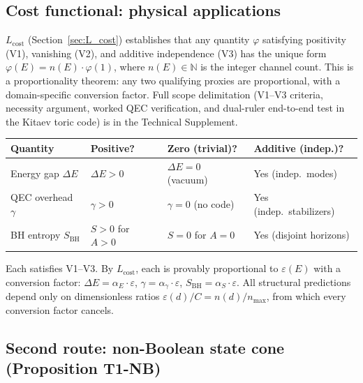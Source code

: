 \documentclass[11pt]{article}
\theoremstyle{remark}
\begin{document}
\subsection{Cost functional: physical applications}
\label{sec:cost_consequences}

\noindent $L_{\mathrm{cost}}$ (Section~\ref{sec:L_cost}) establishes that any quantity $\varphi$ satisfying positivity (V1), vanishing (V2), and additive independence (V3) has the unique form $\varphi(E) = n(E) \cdot \varphi(1)$, where $n(E) \in \mathbb{N}$ is the integer channel count.  This is a proportionality theorem: any two qualifying proxies are proportional, with a domain-specific conversion factor.  Full scope delimitation (V1--V3 criteria, necessity argument, worked QEC verification, and dual-ruler end-to-end test in the Kitaev toric code) is in the Technical Supplement.\label{sec:Lcost_worked}\label{sec:dual_ruler}\label{box:Lcost_proportionality}

\smallskip
\begin{center}
\smallskip
{\small
\begin{tabular*}{\textwidth}{@{\extracolsep{\fill}}llll@{}}
\textbf{Quantity} & \textbf{Positive?} & \textbf{Zero (trivial)?} & \textbf{Additive (indep.)?} \\[2pt]
\hline\noalign{\smallskip}
Energy gap $\Delta E$ & $\Delta E > 0$ & $\Delta E = 0$ (vacuum) & Yes (indep.\ modes) \\[3pt]
QEC overhead $\gamma$ & $\gamma > 0$ & $\gamma = 0$ (no code) & Yes (indep.\ stabilizers) \\[3pt]
BH entropy $S_{\mathrm{BH}}$ & $S > 0$ for $A > 0$ & $S = 0$ for $A = 0$ & Yes (disjoint horizons) \\
\end{tabular*}}
\label{tab:physical_proxies}
\end{center}

\smallskip\noindent Each satisfies V1--V3.  By $L_{\mathrm{cost}}$, each is provably proportional to $\varepsilon(E)$ with a conversion factor: $\Delta E = \alpha_E \cdot \varepsilon$, $\gamma = \alpha_\gamma \cdot \varepsilon$, $S_{\mathrm{BH}} = \alpha_S \cdot \varepsilon$.  All structural predictions depend only on dimensionless ratios $\varepsilon(d)/C = n(d)/n_{\max}$, from which every conversion factor cancels.


\subsection{Second route: non-Boolean state cone (Proposition T1-NB)}
\label{sec:T1NB_route}\label{sec:T1NB}
\end{document}

